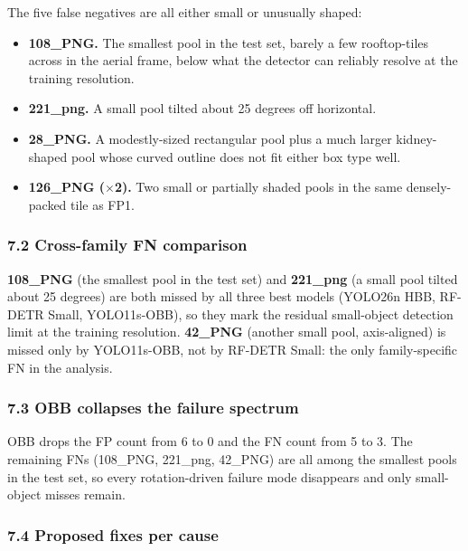 \documentclass[11pt
]{article}
\providecommand{\tightlist}{%
  \setlength{\itemsep}{0pt}\setlength{\parskip}{0pt}}
\begin{document}
The five false negatives are all either small or unusually shaped:

\begin{itemize}
\tightlist
\item
  \textbf{108\_PNG.} The smallest pool in the test set, barely a few
  rooftop-tiles across in the aerial frame, below what the detector can
  reliably resolve at the training resolution.
\item
  \textbf{221\_png.} A small pool tilted about 25 degrees off
  horizontal.
\item
  \textbf{28\_PNG.} A modestly-sized rectangular pool plus a much larger
  kidney-shaped pool whose curved outline does not fit either box type
  well.
\item
  \textbf{126\_PNG ($\times$2).} Two small or partially shaded pools in
  the same densely-packed tile as FP1.
\end{itemize}

\subsubsection{7.2 Cross-family FN comparison}\label{cross-family-fns}

\textbf{108\_PNG} (the smallest pool in the test set) and
\textbf{221\_png} (a small pool tilted about 25 degrees) are both missed
by all three best models (YOLO26n HBB, RF-DETR Small, YOLO11s-OBB), so
they mark the residual small-object detection limit at the training
resolution. \textbf{42\_PNG} (another small pool, axis-aligned) is missed
only by YOLO11s-OBB, not by RF-DETR Small: the only family-specific FN
in the analysis.

\subsubsection{7.3 OBB collapses the failure
spectrum}\label{obb-collapses-failures}

OBB drops the FP count from 6 to 0 and the FN count from 5 to 3. The
remaining FNs (108\_PNG, 221\_png, 42\_PNG) are all among the smallest
pools in the test set, so every rotation-driven failure mode disappears
and only small-object misses remain.

\subsubsection{7.4 Proposed fixes per
cause}\label{proposed-fixes-per-cause}
\end{document}
